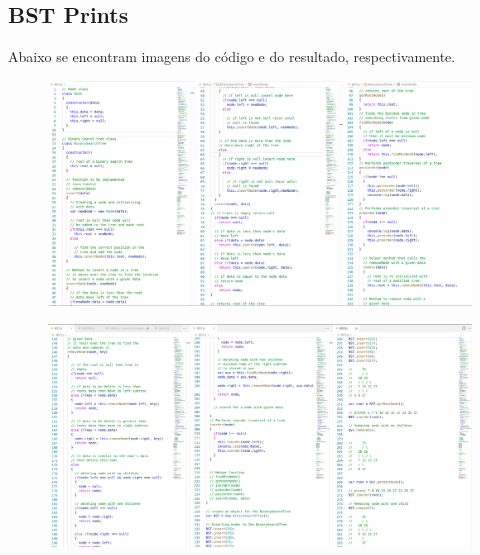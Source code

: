     \subsection{BST Prints}
    Abaixo se encontram imagens do código e do resultado, respectivamente.
    \begin{figure}[H]
    
    	\includegraphics[width=1.1\linewidth]{Pictures/BST_Code1}
    	\caption{}
    	\label{fig:bstcode1}
    \end{figure}
    \begin{figure}[H]
    	\centering
    	\includegraphics[width=1.1\linewidth]{Pictures/BST_Code2}
    	\caption{}
    	\label{fig:bstcode2}
    \end{figure}
